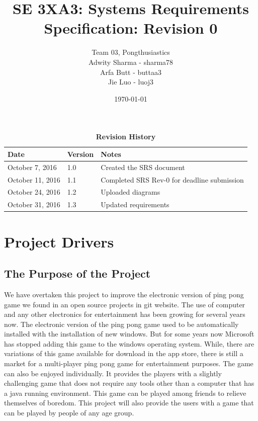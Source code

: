 \documentclass[12pt,letterpaper]{article}
\title{SE 3XA3: Systems Requirements Specification: Revision 0}
\author{Team 03, Pongthusiastics 		
\\ Adwity Sharma - sharma78 		
\\ Arfa Butt - buttaa3 	
	\\ Jie Luo - luoj3 }
\date{\today}
\begin{document}
\maketitle
\newpage
\tableofcontents

\listoftables
\listoffigures
\begin{table}[h]
\caption{\bf Revision History}
\begin{tabularx}{\textwidth}{p{3.5cm}p{2cm}X}
\toprule {\bf Date} & {\bf Version} & {\bf Notes}\\
\midrule
October 7, 2016 & 1.0 & Created the SRS document \\
October 11, 2016 & 1.1 & Completed SRS Rev-0 for deadline submission\\
October 24, 2016 & 1.2 & Uploaded diagrams \\
October 31, 2016 & 1.3 & Updated requirements \\

\bottomrule
\end{tabularx}
\end{table}

\newpage


	
	\section{Project Drivers}
	\subsection{The Purpose of the Project}
	We have overtaken this project to improve the electronic version of ping pong game we found in an open source projects in git website. The use of computer and any other electronics for entertainment has been growing for several years now. The electronic version of the ping pong game used to be automatically installed with the installation of new windows. But for some years now Microsoft has stopped adding this game to the windows operating system. While, there are variations of this game available for download in the app store, there is still a market for a multi-player ping pong game for entertainment purposes. The game can also be enjoyed individually. It provides the players with a slightly challenging game that does not require any tools other than a computer that has a java running environment. This game can be played among friends to relieve themselves of boredom. This project will also provide the users with a game that can be played by people of any age group. \\
\end{document}
